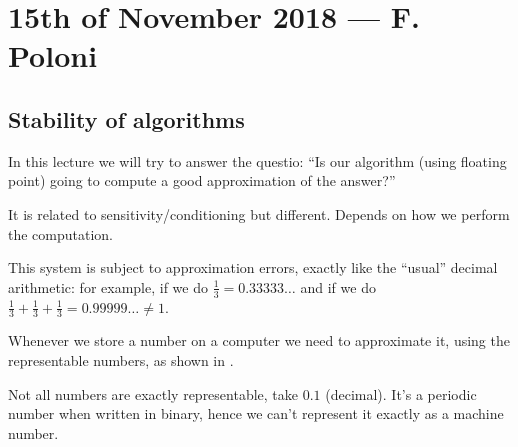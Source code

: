 \documentclass[ComputationalMathematics.tex]{subfiles}
\begin{document}
\section{15th of November 2018 --- F. Poloni}

\subsection{Stability of algorithms}

In this lecture we will try to answer the questio: ``Is our algorithm (using floating point) going to compute a good approximation of the answer?''

It is related to sensitivity/conditioning but different. Depends on how we perform the computation.


This system is subject to approximation errors, exactly like the ``usual'' decimal arithmetic: for example, if we do $\frac{1}{3} = 0.33333 \ldots$ and if we do $\frac{1}{3} + \frac{1}{3} + \frac{1}{3} = 0.99999 \ldots \neq 1$. 

Whenever we store a number on a computer we need to approximate it, using the representable numbers, as shown in .


Not all numbers are exactly representable, take $0.1$ (decimal). It's a periodic number when written in binary, hence we can't represent it exactly as a machine number.
\end{document}
